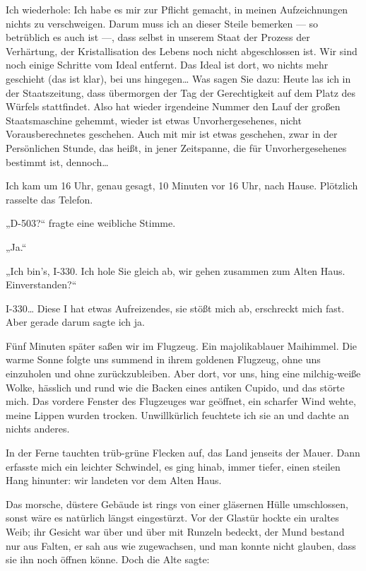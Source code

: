 Ich wiederhole: Ich habe es mir zur Pflicht gemacht, in meinen
Aufzeichnungen nichts zu verschweigen. Darum muss ich an dieser
Steile bemerken — so betrüblich es auch ist —, dass selbst in
unserem Staat der Prozess der Verhärtung, der Kristallisation des
Lebens noch nicht abgeschlossen ist. Wir sind noch einige Schritte
vom Ideal entfernt. Das Ideal ist dort, wo nichts mehr geschieht
(das ist klar), bei uns hingegen\ldots{} Was sagen Sie dazu: Heute las
ich in der Staatszeitung, dass übermorgen der Tag der Gerechtigkeit
auf dem Platz des Würfels stattfindet. Also hat wieder irgendeine
Nummer den Lauf der großen Staatsmaschine gehemmt, wieder ist etwas
Unvorhergesehenes, nicht Vorausberechnetes geschehen. Auch mit mir
ist etwas geschehen, zwar in der Persönlichen Stunde, das heißt, in
jener Zeitspanne, die für Unvorhergesehenes bestimmt ist,
dennoch\ldots{}

Ich kam um 16 Uhr, genau gesagt, 10 Minuten vor 16 Uhr, nach Hause.
Plötzlich rasselte das Telefon.

„D-503?“ fragte eine weibliche Stimme.

„Ja.“

„Ich bin's, I-330. Ich hole Sie gleich ab, wir gehen zusammen zum
Alten Haus. Einverstanden?“

I-330\ldots{} Diese I hat etwas
Aufreizendes, sie stößt mich ab, erschreckt mich fast. Aber gerade
darum sagte ich ja.

Fünf Minuten später saßen wir im Flugzeug. Ein
majolikablauer Maihimmel. Die warme Sonne folgte uns summend in
ihrem goldenen Flugzeug, ohne uns einzuholen und ohne
zurückzubleiben. Aber dort, vor uns, hing eine milchig-weiße Wolke,
hässlich und rund wie die Backen eines antiken Cupido, und das
störte mich. Das vordere Fenster des Flugzeuges war geöffnet, ein
scharfer Wind wehte, meine Lippen wurden trocken. Unwillkürlich
feuchtete ich sie an und dachte an nichts anderes.

In der Ferne
tauchten trüb-grüne Flecken auf, das Land jenseits der Mauer. Dann
erfasste mich ein leichter Schwindel, es ging hinab, immer tiefer,
einen steilen Hang hinunter: wir landeten vor dem Alten Haus.

Das
morsche, düstere Gebäude ist rings von einer gläsernen Hülle
umschlossen, sonst wäre es natürlich längst eingestürzt. Vor der
Glastür hockte ein uraltes Weib; ihr Gesicht war über und über mit
Runzeln bedeckt, der Mund bestand nur aus Falten, er sah aus wie
zugewachsen, und man konnte nicht glauben, dass sie ihn noch öffnen
könne. Doch die Alte sagte:

